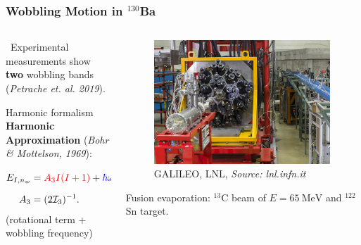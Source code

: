 \documentclass{beamer}
\begin{document}
\begin{frame}
	\frametitle{Wobbling Motion in $^{130}$Ba}
	\begin{columns}
		\begin{column}{0.55\textwidth}
			\faSearch\ Experimental measurements show \textbf{two} wobbling bands (\textit{Petrache et. al. 2019}).
			\begin{exampleblock}{Harmonic formalism}
				\textbf{Harmonic Approximation} (\textit{Bohr \& Mottelson, 1969}):
				\begin{align}
					E_{I,n_w}&={\color{red}A_3I(I+1)}+{\color{blue}\hbar\omega_w\left(n_w+\frac{1}{2}\right)}\nonumber,\\
					A_3&=(2\mathcal{I}_3)^{-1}\nonumber.
				\end{align}
				({\color{red}rotational term} + {\color{blue}wobbling frequency})
			\end{exampleblock}
		\end{column}
		\begin{column}{0.45\textwidth}
			\begin{figure}
				\centering
				\includegraphics[width=0.99\textwidth]{figures/galileo_exp.jpg}
				{\footnotesize GALILEO, LNL, \textit{Source: lnl.infn.it}}
			\end{figure}
			{\footnotesize Fusion evaporation: $^{13}$C beam of $E=65\ \text{MeV}$ and $^{122}$Sn target.}
		\end{column}
	\end{columns}
\end{frame}
\end{document}
